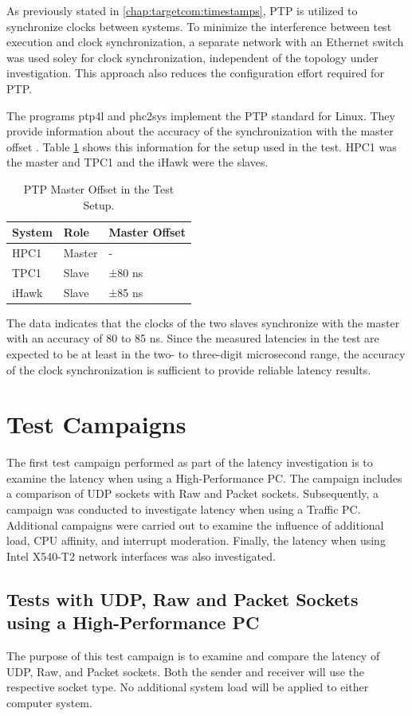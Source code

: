 As previously stated in \ref{chap:targetcom:timestamps}, PTP is utilized to synchronize clocks between systems. To minimize the interference between test execution and clock synchronization, a separate network with an Ethernet switch was used soley for clock synchronization, independent of the topology under investigation. This approach also reduces the configuration effort required for PTP.

The programs ptp4l and phc2sys implement the PTP standard for Linux. They provide information about the accuracy of the synchronization with the master offset \cite{perf02}. Table \ref{tab:PTPMasterOffset} shows this information for the setup used in the test. HPC1 was the master and TPC1 and the iHawk were the slaves.

\begin{table}[h]
\centering
\begin{tabular}{l|l|l}
	\toprule
	\textbf{System} & \textbf{Role} & \textbf{Master Offset} \\
	\midrule
 	HPC1 & Master & - \\ 
 	TPC1 & Slave & ±80 ns \\
 	iHawk & Slave & ±85 ns \\
	\bottomrule
\end{tabular}
\caption{PTP Master Offset in the Test Setup.}
\label{tab:PTPMasterOffset}
\end{table}

The data indicates that the clocks of the two slaves synchronize with the master with an accuracy of 80 to 85 ns. Since the measured latencies in the test are expected to be at least in the two- to three-digit microsecond range, the accuracy of the clock synchronization is sufficient to provide reliable latency results.

\clearpage
\section{Test Campaigns}
The first test campaign performed as part of the latency investigation is to examine the latency when using a High-Performance PC. The campaign includes a comparison of UDP sockets with Raw and Packet sockets. Subsequently, a campaign was conducted to investigate latency when using a Traffic PC. Additional campaigns were carried out to examine the influence of additional load, CPU affinity, and interrupt moderation. Finally, the latency when using Intel X540-T2 network interfaces was also investigated.

\subsection{Tests with UDP, Raw and Packet Sockets using a High-Performance PC} \label{chap:PerfSockType}
The purpose of this test campaign is to examine and compare the latency of UDP, Raw, and Packet sockets. Both the sender and receiver will use the respective socket type. No additional system load will be applied to either computer system.

